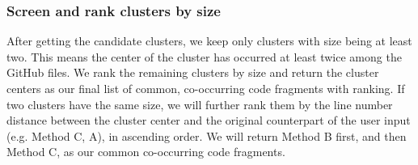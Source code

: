 \subsubsection{Screen and rank clusters by size}
After getting the candidate clusters, we keep only clusters with size being at least two. This means the center of the cluster has occurred at least twice among the GitHub files.
We rank the remaining clusters by size and return the cluster centers as our final list of common, co-occurring code fragments with ranking. If two clusters have the same size, we will further rank them by the line number distance between the cluster center and the original counterpart of the user input (e.g. {\ttt Method C, A}), in ascending order. We will return {\ttt Method B} first, and then {\ttt Method C}, as our common co-occurring code fragments.